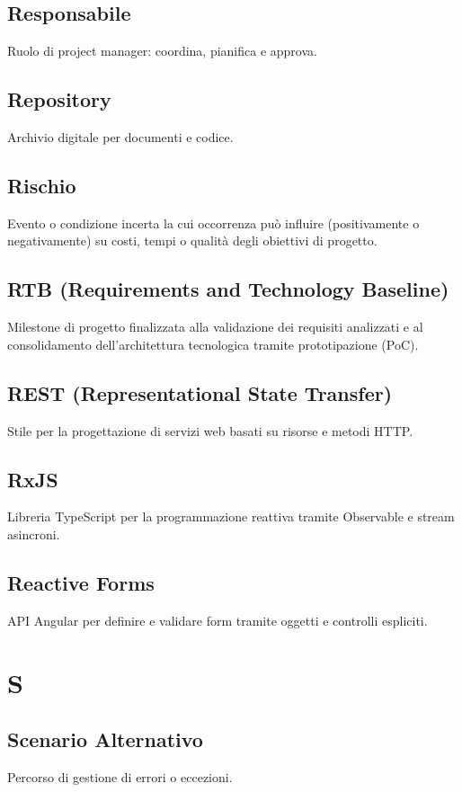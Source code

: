 \documentclass[a4paper,12pt]{article}
\begin{document}
\subsection{Responsabile}
Ruolo di project manager: coordina, pianifica e approva.

\subsection{Repository}
Archivio digitale per documenti e codice.

\subsection{Rischio}
 Evento o condizione incerta la cui occorrenza può influire (positivamente o negativamente) su costi, tempi o qualità degli obiettivi di progetto.

\subsection{RTB (Requirements and Technology Baseline)}
Milestone di progetto finalizzata alla validazione dei requisiti analizzati e al consolidamento dell'architettura tecnologica tramite prototipazione (PoC).

\subsection{REST (Representational State Transfer)}
Stile per la progettazione di servizi web basati su risorse e metodi HTTP.

\subsection{RxJS}
Libreria TypeScript per la programmazione reattiva tramite Observable e stream asincroni.

\subsection{Reactive Forms}
API Angular per definire e validare form tramite oggetti e controlli espliciti.

\section{S}
\subsection{Scenario Alternativo}
Percorso di gestione di errori o eccezioni.
\end{document}
